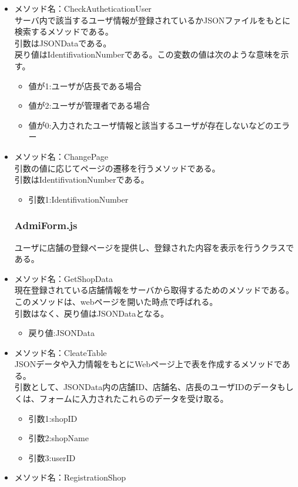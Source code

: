 \documentclass[a4j]{jarticle}
\begin{document}
\begin{itemize}
\item メソッド名：CheckAutheticationUser\\

サーバ内で該当するユーザ情報が登録されているかJSONファイルをもとに検索するメソッドである。\\
引数はJSONDataである。\\
戻り値はIdentifivationNumberである。この変数の値は次のような意味を示す。
	\begin{itemize}
		\item 値が1:ユーザが店長である場合
		\item 値が2:ユーザが管理者である場合
		\item 値が0:入力されたユーザ情報と該当するユーザが存在しないなどのエラー
	\end{itemize}


\item メソッド名：ChangePage\\

引数の値に応じてページの遷移を行うメソッドである。\\
引数はIdentifivationNumberである。

	\begin{itemize}
		\item 引数1:IdentifivationNumber
	\end{itemize}
\subsubsection{AdmiForm.js}
ユーザに店舗の登録ページを提供し、登録された内容を表示を行うクラスである。

\item メソッド名：GetShopData\\

現在登録されている店舗情報をサーバから取得するためのメソッドである。このメソッドは、webページを開いた時点で呼ばれる。\\
引数はなく、戻り値はJSONDataとなる。
	\begin{itemize}
		\item 戻り値:JSONData
	\end{itemize}

\item メソッド名：CleateTable\\
JSONデータや入力情報をもとにWebページ上で表を作成するメソッドである。\\
引数として、JSONData内の店舗ID、店舗名、店長のユーザIDのデータもしくは、フォームに入力されたこれらのデータを受け取る。
	\begin{itemize}
		\item 引数1:shopID
		\item 引数2:shopName
		\item 引数3:userID
	\end{itemize}
\item メソッド名：RegistrationShop\\


\end{itemize}
\end{document}
